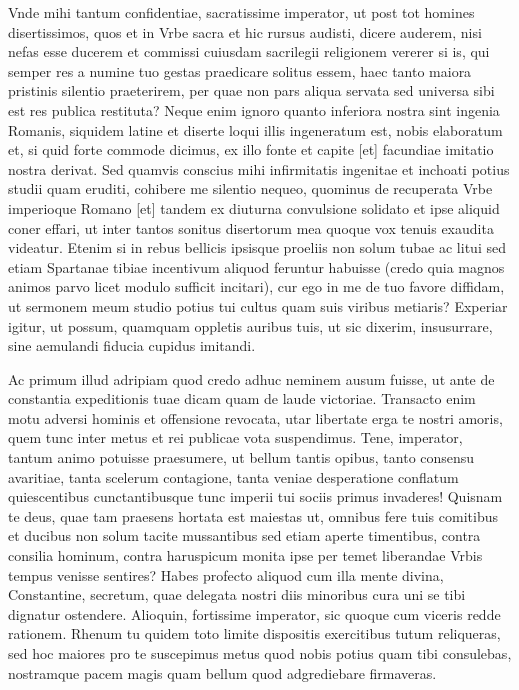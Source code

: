 Vnde mihi tantum confidentiae, sacratissime imperator, ut post tot homines disertissimos, quos et in Vrbe sacra et hic rursus audisti, dicere auderem, nisi nefas esse ducerem et commissi cuiusdam sacrilegii religionem vererer si is, qui semper res a numine tuo gestas praedicare solitus essem, haec tanto maiora pristinis silentio praeterirem, per quae non pars aliqua servata sed universa sibi est res publica restituta? Neque enim ignoro quanto inferiora nostra sint ingenia Romanis, siquidem latine et diserte loqui illis ingeneratum est, nobis elaboratum et, si quid forte commode dicimus, ex illo fonte et capite [et] facundiae imitatio nostra derivat. Sed quamvis conscius mihi infirmitatis ingenitae et inchoati potius studii quam eruditi, cohibere me silentio nequeo, quominus de recuperata Vrbe imperioque Romano [et] tandem ex diuturna convulsione solidato et ipse aliquid coner effari, ut inter tantos sonitus disertorum mea quoque vox tenuis exaudita videatur. Etenim si in rebus bellicis ipsisque proeliis non solum tubae ac litui sed etiam Spartanae tibiae incentivum aliquod feruntur habuisse (credo quia magnos animos parvo licet modulo sufficit incitari), cur ego in me de tuo favore diffidam, ut sermonem meum studio potius tui cultus quam suis viribus metiaris? Experiar igitur, ut possum, quamquam oppletis auribus tuis, ut sic dixerim, insusurrare, sine aemulandi fiducia cupidus imitandi.

Ac primum illud adripiam quod credo adhuc neminem ausum fuisse, ut ante de constantia expeditionis tuae dicam quam de laude victoriae.  Transacto enim motu adversi hominis et offensione revocata, utar libertate erga te nostri amoris, quem tunc inter metus et rei publicae vota suspendimus. Tene, imperator, tantum animo potuisse praesumere, ut bellum tantis opibus, tanto consensu avaritiae, tanta scelerum contagione, tanta veniae desperatione conflatum quiescentibus cunctantibusque tunc imperii tui sociis primus invaderes! Quisnam te deus, quae tam praesens hortata est maiestas ut, omnibus fere tuis comitibus et ducibus non solum tacite mussantibus sed etiam aperte timentibus, contra consilia hominum, contra haruspicum monita ipse per temet liberandae Vrbis tempus venisse sentires? Habes profecto aliquod cum illa mente divina, Constantine, secretum, quae delegata nostri diis minoribus cura uni se tibi dignatur ostendere. Alioquin, fortissime imperator, sic quoque cum viceris redde rationem. Rhenum tu quidem toto limite dispositis exercitibus tutum reliqueras, sed hoc maiores pro te suscepimus metus quod nobis potius quam tibi consulebas, nostramque pacem magis quam bellum quod adgrediebare firmaveras. 

